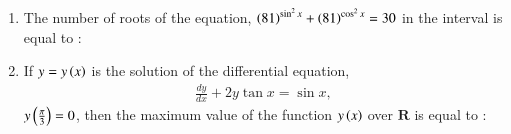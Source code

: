 \documentclass[journal]{IEEEtran}
\numberwithin{equation}{enumi}
\numberwithin{figure}{enumi}
\begin{document}
\begin{enumerate}
    \hfill{}
    
    \begin{enumerate}
    \end{enumerate}

    \item 
    The number of roots of the equation, $\left(81\right)^{\sin^2{x}} + \left(81\right)^{\cos^2{x}} = 30$ in the interval  is equal to : 

    \hfill{}
    
    \begin{enumerate}
    \end{enumerate}

    \item 
    If $y = y\left(x\right)$ is the solution of the differential equation, 
    \begin{align*}
        \frac{dy}{dx} + 2y\tan{x} = \sin{x},
    \end{align*} 
    $y\left(\frac{\pi}{3}\right) = 0$, then the maximum value of the function $y\left(x\right)$ over $\mathbf{R}$ is equal to :

    \hfill{}
    
    \begin{enumerate}
    \end{enumerate}


\end{enumerate}
\end{document}
